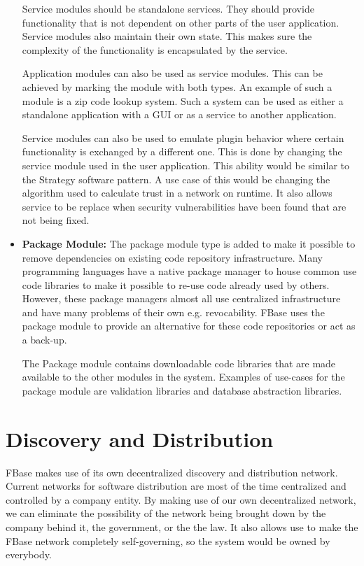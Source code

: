 \begin{itemize}
	Service modules should be standalone services. They should provide functionality that is not dependent on other parts of the user application. Service modules also maintain their own state. This makes sure the complexity of the functionality is encapsulated by the service.
	
	Application modules can also be used as service modules. This can be achieved by marking the module with both types. An example of such a module is a zip code lookup system. Such a system can be used as either a standalone application with a GUI or as a service to another application.
	
	Service modules can also be used to emulate plugin behavior where certain functionality is exchanged by a different one. This is done by changing the service module used in the user application. This ability would be similar to the Strategy software pattern. A use case of this would be changing the algorithm used to calculate trust in a network on runtime. It also allows service to be replace when security vulnerabilities have been found that are not being fixed.
	
	\item \textbf{Package Module:}
	The package module type is added to make it possible to remove dependencies on existing code repository infrastructure. Many programming languages have a native package manager to house common use code libraries to make it possible to re-use code already used by others. However, these package managers almost all use centralized infrastructure and have many problems of their own e.g. revocability. FBase uses the package module to provide an alternative for these code repositories or act as a back-up.
	
	The Package module contains downloadable code libraries that are made available to the other modules in the system. Examples of use-cases for the package module are validation libraries and database abstraction libraries.
\end{itemize}

\section{Discovery and Distribution}

FBase makes use of its own decentralized discovery and distribution network. Current networks for software distribution are most of the time centralized and controlled by a company entity. By making use of our own decentralized network, we can eliminate the possibility of the network being brought down by the company behind it, the government, or the the law. It also allows use to make the FBase network completely self-governing, so the system would be owned by everybody.

